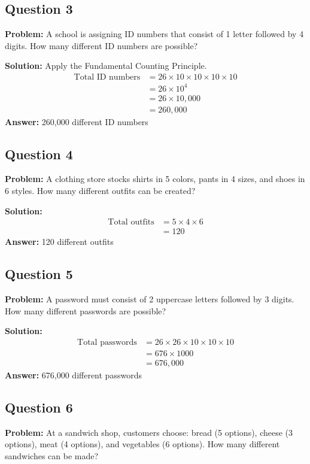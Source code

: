 \documentclass[12pt]{article}
\begin{document}
\subsection*{Question 3}
\textbf{Problem:} A school is assigning ID numbers that consist of 1 letter followed by 4 digits. How many different ID numbers are possible?

\textbf{Solution:} Apply the Fundamental Counting Principle.
\begin{align*}
\text{Total ID numbers} &= 26 \times 10 \times 10 \times 10 \times 10 \\
&= 26 \times 10^4 \\
&= 26 \times 10{,}000 \\
&= 260{,}000
\end{align*}
\textbf{Answer:} 260,000 different ID numbers

\subsection*{Question 4}
\textbf{Problem:} A clothing store stocks shirts in 5 colors, pants in 4 sizes, and shoes in 6 styles. How many different outfits can be created?

\textbf{Solution:}
\begin{align*}
\text{Total outfits} &= 5 \times 4 \times 6 \\
&= 120
\end{align*}
\textbf{Answer:} 120 different outfits

\subsection*{Question 5}
\textbf{Problem:} A password must consist of 2 uppercase letters followed by 3 digits. How many different passwords are possible?

\textbf{Solution:}
\begin{align*}
\text{Total passwords} &= 26 \times 26 \times 10 \times 10 \times 10 \\
&= 676 \times 1000 \\
&= 676{,}000
\end{align*}
\textbf{Answer:} 676,000 different passwords

\subsection*{Question 6}
\textbf{Problem:} At a sandwich shop, customers choose: bread (5 options), cheese (3 options), meat (4 options), and vegetables (6 options). How many different sandwiches can be made?
\end{document}
